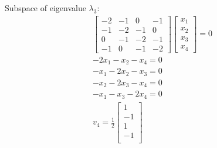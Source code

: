 \documentclass{article}
\begin{document}
	Subspace of eigenvalue $\lambda_{3}$:
	\begin{gather*}
	\begin{bmatrix}	
	-2 & -1 & 0 & -1\\
	-1 & -2 & -1 & 0\\
	0 & -1 & -2 & -1\\
	-1 & 0 & -1 & -2
	\end{bmatrix}\begin{bmatrix}
	x_{1}\\
	x_{2}\\
	x_{3}\\
	x_{4}
	\end{bmatrix}=0 \\
	-2x_{1} -x_{2} -x_{4}=0\\
	-x_{1} - 2x_{2} -x_{3}=0\\
	-x_{2} - 2x_{3} -x_{4}=0\\
	-x_{1} -x_{3} - 2x_{4}=0\\
	v_{4}=\frac{1}{2}\begin{bmatrix}
	1\\
	-1\\
	1\\
	-1\\
	\end{bmatrix}
	\end{gather*}
\end{document}

